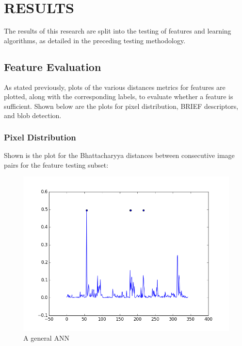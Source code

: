 %
%
%



\chapter{RESULTS}

The results of this research are split into the testing of features and learning algorithms, as detailed in the preceding testing methodology.

\section{Feature Evaluation}
As stated previously, plots of the various distances metrics for features are plotted, along with the corresponding labels, to evaluate whether a feature is sufficient.
Shown below are the plots for pixel distribution, BRIEF descriptors, and blob detection.

\subsection{Pixel Distribution}
Shown is the plot for the Bhattacharyya distances between consecutive image pairs for the feature testing subset:

\begin{figure}[h]
\centering
\includegraphics[scale=.50]{figures/611bhattest}
\caption{A general ANN}
\label{fig:tamu-fig3}
\end{figure}

